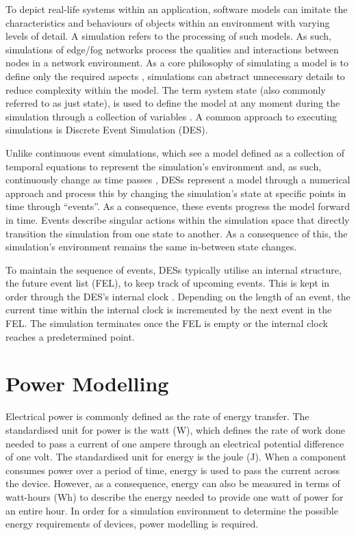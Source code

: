 \documentclass{l4proj}
\begin{document}
To depict real-life systems within an application, software models can imitate the characteristics and behaviours of objects within an environment with varying levels of detail.
A simulation refers to the processing of such models.
As such, simulations of edge/fog networks process the qualities and interactions between nodes in a network environment.
As a core philosophy of simulating a model is to define only the required aspects \citep{simulations}, simulations can abstract unnecessary details to reduce complexity within the model.
The term system state (also commonly referred to as just state), is used to define the model at any moment during the simulation through a collection of variables \citep{des-old}.
A common approach to executing simulations is Discrete Event Simulation (DES).

Unlike continuous event simulations, which see a model defined as a collection of temporal equations to represent the simulation's environment and, as such, continuously change as time passes \cite{simpy}, DESs represent a model through a numerical approach and process this by changing the simulation's state at specific points in time through ``events''.
As a consequence, these events progress the model forward in time.
Events describe singular actions within the simulation space that directly transition the simulation from one state to another.
As a consequence of this, the simulation's environment remains the same in-between state changes.

To maintain the sequence of events, DESs typically utilise an internal structure, the future event list (FEL), to keep track of upcoming events.
This is kept in order through the DES's internal clock \citep{Des}.
Depending on the length of an event, the current time within the internal clock is incremented by the next event in the FEL.
The simulation terminates once the FEL is empty or the internal clock reaches a predetermined point.

\section{Power Modelling}
Electrical power is commonly defined as the rate of energy transfer.
The standardised unit for power is the watt (W), which defines the rate of work done needed to pass a current of one ampere through an electrical potential difference of one volt.
The standardised unit for energy is the joule (J).
When a component consumes power over a period of time, energy is used to pass the current across the device.
However, as a consequence, energy can also be measured in terms of watt-hours (Wh) to describe the energy needed to provide one watt of power for an entire hour.
In order for a simulation environment to determine the possible energy requirements of devices, power modelling is required.
\end{document}
